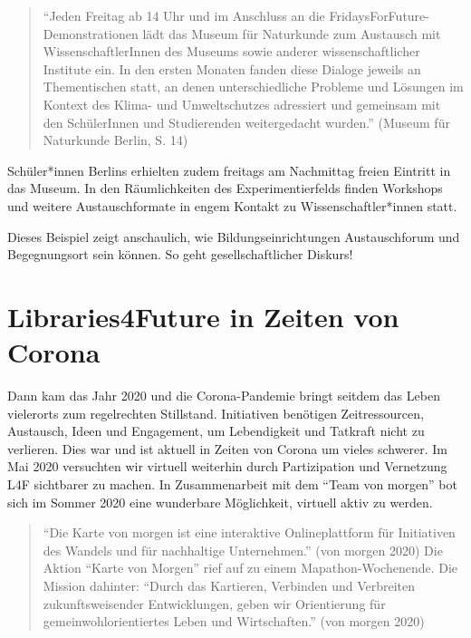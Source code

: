 \documentclass[a4paper,
fontsize=11pt,
oneside,
numbers=noperiodatend,
parskip=half-,
bibliography=totoc,
final
]{scrartcl}
\begin{document}
\begin{quote}
\enquote{Jeden Freitag ab 14 Uhr und im Anschluss an die
FridaysForFuture-Demonstrationen lädt das Museum für Naturkunde zum
Austausch mit WissenschaftlerInnen des Museums sowie anderer
wissenschaftlicher Institute ein. In den ersten Monaten fanden diese
Dialoge jeweils an Thementischen statt, an denen unterschiedliche
Probleme und Lösungen im Kontext des Klima- und Umweltschutzes
adressiert und gemeinsam mit den SchülerInnen und Studierenden
weitergedacht wurden.} (Museum für Naturkunde Berlin, S. 14)
\end{quote}

Schüler*innen Berlins erhielten zudem freitags am Nachmittag freien
Eintritt in das Museum. In den Räumlichkeiten des Experimentierfelds
finden Workshops und weitere Austauschformate in engem Kontakt zu
Wissenschaftler*innen statt.

Dieses Beispiel zeigt anschaulich, wie Bildungseinrichtungen
Austauschforum und Begegnungsort sein können. So geht gesellschaftlicher
Diskurs!

\hypertarget{libraries4future-in-zeiten-von-corona}{%
\section{Libraries4Future in Zeiten von
Corona}\label{libraries4future-in-zeiten-von-corona}}

Dann kam das Jahr 2020 und die Corona-Pandemie bringt seitdem das Leben
vielerorts zum regelrechten Stillstand. Initiativen benötigen
Zeitressourcen, Austausch, Ideen und Engagement, um Lebendigkeit und
Tatkraft nicht zu verlieren. Dies war und ist aktuell in Zeiten von
Corona um vieles schwerer. Im Mai 2020 versuchten wir virtuell weiterhin
durch Partizipation und Vernetzung L4F sichtbarer zu machen. In
Zusammenarbeit mit dem \enquote{Team von morgen} bot sich im Sommer 2020
eine wunderbare Möglichkeit, virtuell aktiv zu werden.

\begin{quote}
\enquote{Die Karte von morgen ist eine interaktive Onlineplattform für
Initiativen des Wandels und für nachhaltige Unternehmen.} (von morgen
2020) Die Aktion \enquote{Karte von Morgen} rief auf zu einem
Mapathon-Wochenende. Die Mission dahinter: \enquote{Durch das Kartieren,
Verbinden und Verbreiten zukunftsweisender Entwicklungen, geben wir
Orientierung für gemeinwohlorientiertes Leben und Wirtschaften.} (von
morgen 2020)
\end{quote}
\end{document}
